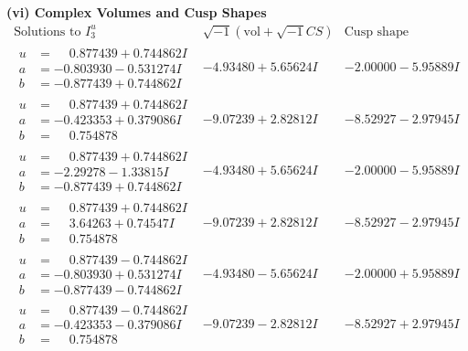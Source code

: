\documentclass[1p]{elsarticle_modified}
\theoremstyle{definition}
\newcommand{\I}{\sqrt{-1}}
\begin{document}
\newpage\flushleft \textbf{(vi) Complex Volumes and Cusp Shapes}
$$\begin{array}{c|c|c}  
\text{Solutions to }I^u_{3}& \I (\text{vol} + \sqrt{-1}CS) & \text{Cusp shape}\\
 \hline 
\begin{aligned}
u &= \phantom{-}0.877439 + 0.744862 I \\
a &= -0.803930 - 0.531274 I \\
b &= -0.877439 + 0.744862 I\end{aligned}
 & -4.93480 + 5.65624 I & -2.00000 - 5.95889 I \\ \hline\begin{aligned}
u &= \phantom{-}0.877439 + 0.744862 I \\
a &= -0.423353 + 0.379086 I \\
b &= \phantom{-}0.754878\phantom{ +0.000000I}\end{aligned}
 & -9.07239 + 2.82812 I & -8.52927 - 2.97945 I \\ \hline\begin{aligned}
u &= \phantom{-}0.877439 + 0.744862 I \\
a &= -2.29278 - 1.33815 I \\
b &= -0.877439 + 0.744862 I\end{aligned}
 & -4.93480 + 5.65624 I & -2.00000 - 5.95889 I \\ \hline\begin{aligned}
u &= \phantom{-}0.877439 + 0.744862 I \\
a &= \phantom{-}3.64263 + 0.74547 I \\
b &= \phantom{-}0.754878\phantom{ +0.000000I}\end{aligned}
 & -9.07239 + 2.82812 I & -8.52927 - 2.97945 I \\ \hline\begin{aligned}
u &= \phantom{-}0.877439 - 0.744862 I \\
a &= -0.803930 + 0.531274 I \\
b &= -0.877439 - 0.744862 I\end{aligned}
 & -4.93480 - 5.65624 I & -2.00000 + 5.95889 I \\ \hline\begin{aligned}
u &= \phantom{-}0.877439 - 0.744862 I \\
a &= -0.423353 - 0.379086 I \\
b &= \phantom{-}0.754878\phantom{ +0.000000I}\end{aligned}
 & -9.07239 - 2.82812 I & -8.52927 + 2.97945 I \\ \hline\begin{aligned}

\end{aligned}
\end{array}$$
\end{document}
